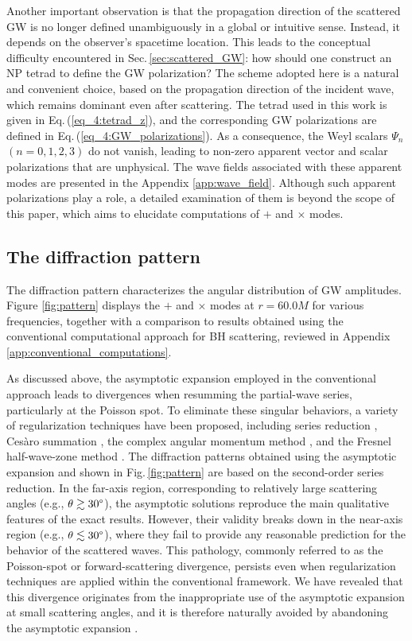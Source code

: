 \documentclass[reprint,amsmath,amssymb,aps,prd]{revtex4-2}
\begin{document}
Another important observation is that the propagation direction of the scattered GW is no longer defined unambiguously in a global or intuitive sense. Instead, it depends on the observer’s spacetime location. This leads to the conceptual difficulty encountered in Sec.\,\ref{sec:scattered_GW}: how should one construct an NP tetrad to define the GW polarization? The scheme adopted here is a natural and convenient choice, based on the propagation direction of the incident wave, which remains dominant even after scattering. The tetrad used in this work is given in Eq.\,(\ref{eq_4:tetrad_z}), and the corresponding GW polarizations are defined in Eq.\,(\ref{eq_4:GW_polarizations}).
As a consequence, the Weyl scalars $\Psi_n$ $(n=0,1,2,3)$ do not vanish, leading to non-zero apparent vector and scalar polarizations that are unphysical. The wave fields associated with these apparent modes are presented in the Appendix \ref{app:wave_field}. Although such apparent polarizations play a role, a detailed examination of them is beyond the scope of this paper, which aims to elucidate computations of $+$ and $\times$ modes.

\subsection{The diffraction pattern}
The diffraction pattern characterizes the angular distribution of GW amplitudes. Figure \ref{fig:pattern} displays the $+$ and $\times$ modes at $r=60.0M$ for various frequencies, together with a comparison to results obtained using the conventional computational approach for BH scattering, reviewed in Appendix \ref{app:conventional_computations}.

As discussed above, the asymptotic expansion employed in the conventional approach leads to divergences when resumming the partial-wave series, particularly at the Poisson spot. To eliminate these singular behaviors, a variety of regularization techniques have been proposed, including series reduction \cite{Yennie_1954,Stratton_2020,Dolan_2008b}, Ces\`{a}ro summation \cite{Pijnenburg_2024b}, the complex angular momentum method \cite{Andersson_1994,Folacci_2019a,Folacci_2019b}, and the Fresnel half-wave-zone method \cite{Zhang_Fan_2021}. The diffraction patterns obtained using the asymptotic expansion and shown in Fig.\,\ref{fig:pattern} are based on the second-order series reduction. In the far-axis region, corresponding to relatively large scattering angles (e.g., $\theta\gtrsim30\text{\textdegree}$), the asymptotic solutions reproduce the main qualitative features of the exact results. However, their validity breaks down in the near-axis region (e.g., $\theta\lesssim30\text{\textdegree}$), where they fail to provide any reasonable prediction for the behavior of the scattered waves. This pathology, commonly referred to as the Poisson-spot or forward-scattering divergence, persists even when regularization techniques are applied within the conventional framework. We have revealed that this divergence originates from the inappropriate use of the asymptotic expansion at small scattering angles, and it is therefore naturally avoided by abandoning the asymptotic expansion \cite{Li_2025_b}.
\end{document}
